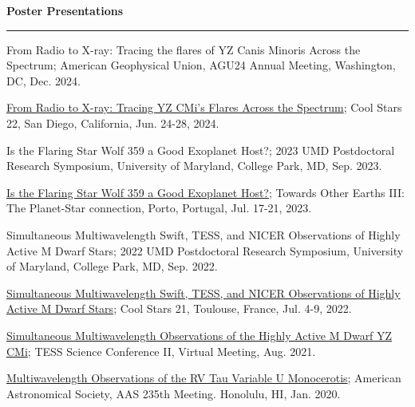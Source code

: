 \documentclass[letter,12pt]{article}
\begin{document}


\noindent
{\bf Poster Presentations} \\
\vspace{-10mm}
\begin{center}
\rule{\textwidth}{0.2mm}
\end{center}
\vspace{-3mm}
\noindent
\begin{etaremune}
\renewcommand\labelenumi{\bfseries\theenumi .}

\item From Radio to X-ray: Tracing the flares of YZ Canis Minoris Across the Spectrum; American Geophysical Union, AGU24 Annual Meeting, Washington, DC, Dec. 2024.

\item \href{https://coolstars22.github.io/docs/CS22_Abstract_booklet.pdf}{From Radio to X-ray: Tracing YZ CMi's Flares Across the
Spectrum}; Cool Stars 22, San Diego, California, Jun. 24-28, 2024.

\item Is the Flaring Star Wolf 359 a Good Exoplanet Host?; 2023 UMD Postdoctoral Research Symposium, University of Maryland, College Park, MD, Sep. 2023.

\item \href{http://www.astro.up.pt/~sousasag/toe2023/Abstract_book_Posters.pdf}{Is the Flaring Star Wolf 359 a Good Exoplanet Host?}; Towards Other Earths III: The Planet-Star connection, Porto, Portugal, Jul. 17-21, 2023.

\item Simultaneous Multiwavelength Swift, TESS, and NICER Observations of Highly Active M Dwarf Stars; 2022 UMD Postdoctoral Research Symposium, University of Maryland, College Park, MD, Sep. 2022.

\item \href{https://coolstars21.github.io/docs/CS21booklet.pdf}{Simultaneous Multiwavelength Swift, TESS, and NICER Observations of Highly Active M Dwarf Stars}; Cool Stars 21, Toulouse, France, Jul. 4-9, 2022.

\item \href{https://zenodo.org/record/5142127#.YmbZsJPMJCV}{Simultaneous Multiwavelength Observations of the Highly Active M Dwarf YZ CMi}; TESS Science Conference II, Virtual Meeting, Aug. 2021.

\item \href{https://ui.adsabs.harvard.edu/abs/2020AAS...23510607V/abstract}{Multiwavelength Observations of the RV Tau Variable U Monocerotis}; American Astronomical Society, AAS 235th Meeting.  Honolulu, HI, Jan.  2020.


\end{etaremune}
\end{document}
